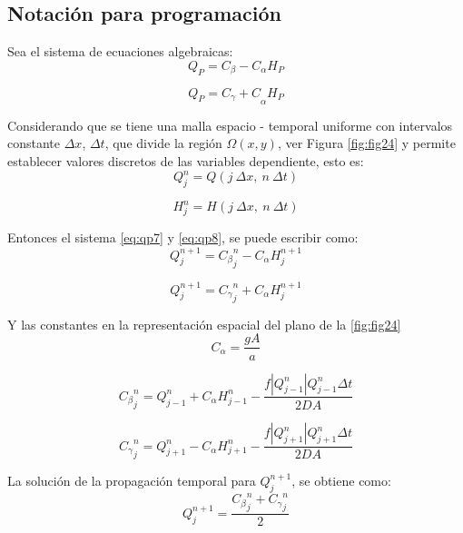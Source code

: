 \documentclass[letterpaper]{report}
\begin{document}
\subsection{Notación para programación}
Sea el sistema de ecuaciones algebraicas:
\begin{equation}
	Q_P=C_\beta-C_\alpha H_P
\label{eq:qp7}
\end{equation}

\begin{equation}
	Q_P={C_\gamma+C}_\alpha H_P
\label{eq:qp8}
\end{equation}

Considerando que se tiene una malla espacio - temporal uniforme con intervalos constante $\Delta x$, $\Delta t$, que divide la 
región $\Omega(x,y)$, ver Figura \ref{fig:fig24} y permite establecer valores discretos de las variables dependiente, esto es:
\begin{equation}
	Q_j^n=Q(j\ \Delta x,\ n\ \Delta t)
\label{eq:qp9}
\end{equation}

\begin{equation}
	H_j^n=H(j\ \Delta x,\ n\ \Delta t)
\label{eq:qp10}
\end{equation}

Entonces el sistema \ref{eq:qp7} y \ref{eq:qp8}, se puede escribir como:
\begin{equation}
	Q_j^{n+1}={C_\beta}_j^n-C_\alpha H_j^{n+1}
\label{eq:qp11}
\end{equation}

\begin{equation}
	Q_j^{n+1}={C_\gamma}_j^n+C_\alpha H_j^{n+1}
\label{eq:qp12}
\end{equation}

Y las constantes en la representación espacial del plano de la \ref{fig:fig24}
\begin{equation}
	C_\alpha=\frac{gA}{a}
\label{eq:qp13}
\end{equation}

\begin{equation}
	{C_\beta}_j^n=Q_{j-1}^n+C_\alpha H_{j-1}^n-\dfrac{f|Q_{j-1}^n|Q_{j-1}^n \Delta t}{2DA}
\label{eq:qp14}
\end{equation}

\begin{equation}
	{C_\gamma}_j^n=Q_{j+1}^n-C_\alpha H_{j+1}^n-\dfrac{f|Q_{j+1}^n|Q_{j+1}^n \Delta t}{2DA}
\label{eq:qp15}
\end{equation}

La solución de la propagación temporal para $Q_j^{n+1}$, se obtiene como:
\begin{equation}
	Q_j^{n+1}=\dfrac{{C_\beta}_j^n+{C_\gamma}_j^n}{2}
\label{eq:qp16}
\end{equation}
\end{document}
